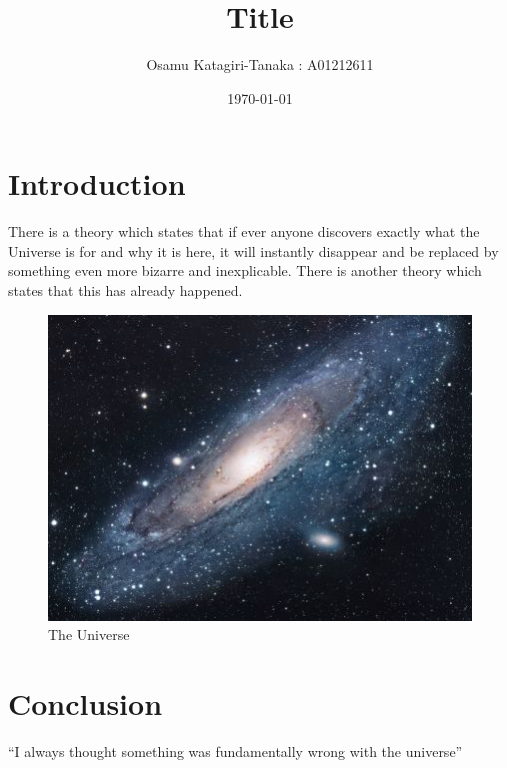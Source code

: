 \documentclass{article}
\title{Title}
\author{Osamu Katagiri-Tanaka : A01212611}
\date{\today}
\begin{document}
\maketitle

\section{Introduction}
There is a theory which states that if ever anyone discovers exactly what the Universe is for and why it is here, it will instantly disappear and be replaced by something even more bizarre and inexplicable.
There is another theory which states that this has already happened.

\begin{figure}[h!]
\centering
\includegraphics[scale=1.7]{universe}
\caption{The Universe}
\label{fig:universe}
\end{figure}

\section{Conclusion}
``I always thought something was fundamentally wrong with the universe'' \citep{adams1995hitchhiker}

\printbibliography[title={References}]
\end{document}
